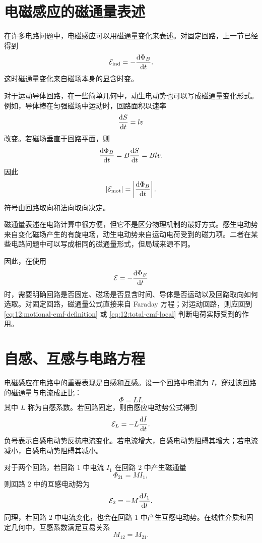 \section{电磁感应的磁通量表述}

在许多电路问题中，电磁感应可以用磁通量变化来表述。对固定回路，上一节已经得到
\[
\mathcal{E}_{\mathrm{ind}}
=
-\frac{\mathop{}\!\mathrm{d}\Phi_{B}}{\mathop{}\!\mathrm{d} t}.
\]
这时磁通量变化来自磁场本身的显含时变。

对于运动导体回路，在一些简单几何中，动生电动势也可以写成磁通量变化形式。例如，导体棒在匀强磁场中运动时，回路面积以速率
\[
\frac{\mathop{}\!\mathrm{d} S}{\mathop{}\!\mathrm{d} t}
=
lv
\]
改变。若磁场垂直于回路平面，则
\[
\frac{\mathop{}\!\mathrm{d} \Phi_{B}}{\mathop{}\!\mathrm{d} t}
=
B\frac{\mathop{}\!\mathrm{d} S}{\mathop{}\!\mathrm{d} t}
=
Blv.
\]
因此
\[
|\mathcal{E}_{\mathrm{mot}}|
=
\left|
\frac{\mathop{}\!\mathrm{d}\Phi_{B}}{\mathop{}\!\mathrm{d} t}
\right|.
\]
符号由回路取向和法向取向决定。

磁通量表述在电路计算中很方便，但它不是区分物理机制的最好方式。感生电动势来自变化磁场产生的有旋电场，动生电动势来自运动电荷受到的磁力项。二者在某些电路问题中可以写成相同的磁通量形式，但局域来源不同。

因此，在使用
\[
\mathcal{E}
=
-\frac{\mathop{}\!\mathrm{d}\Phi_{B}}{\mathop{}\!\mathrm{d} t}
\]
时，需要明确回路是否固定、磁场是否显含时间、导体是否运动以及回路取向如何选取。对固定回路，磁通量公式直接来自 Faraday 方程；对运动回路，则应回到 \eqref{eq:12:motional-emf-definition} 或 \eqref{eq:12:total-emf-local} 判断电荷实际受到的作用。

\section{自感、互感与电路方程}

电磁感应在电路中的重要表现是自感和互感。设一个回路中电流为 $I$，穿过该回路的磁通量与电流成正比：
\[
\Phi
=
LI.
\]
其中 $L$ 称为自感系数。若回路固定，则由感应电动势公式得到
\begin{equation}
	\mathcal{E}_{L}
	=
	-L\frac{\mathop{}\!\mathrm{d} I}{\mathop{}\!\mathrm{d} t}.
	\label{eq:12:self-induction-emf}
\end{equation}
负号表示自感电动势反抗电流变化。若电流增大，自感电动势阻碍其增大；若电流减小，自感电动势阻碍其减小。

对于两个回路，若回路 $1$ 中电流 $I_{1}$ 在回路 $2$ 中产生磁通量
\[
\Phi_{21}
=
MI_{1},
\]
则回路 $2$ 中的互感电动势为
\begin{equation}
	\mathcal{E}_{2}
	=
	-M\frac{\mathop{}\!\mathrm{d} I_{1}}{\mathop{}\!\mathrm{d} t}.
	\label{eq:12:mutual-induction-emf}
\end{equation}
同理，若回路 $2$ 中电流变化，也会在回路 $1$ 中产生互感电动势。在线性介质和固定几何中，互感系数满足互易关系
\[
M_{12}=M_{21}.
\]

